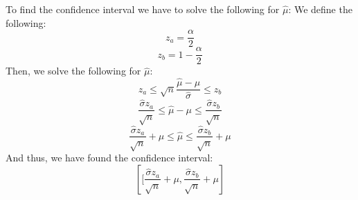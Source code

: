 To find the confidence interval we have to solve the following for $\hat\mu$:
We define the following:
$$
z_a = \frac{\alpha}{2}
$$
$$
z_b = 1-\frac{\alpha}{2}
$$
Then, we solve the following for $\hat\mu$:
$$
z_a \leq \sqrt{n}\frac{\hat\mu - \mu}{\hat\sigma} \leq z_b
$$
$$
\frac{\hat\sigma z_a}{\sqrt{n}} \leq \hat\mu - \mu \leq \frac{\hat\sigma z_b}{\sqrt{n}}
$$
$$
\frac{\hat\sigma z_a}{\sqrt{n}} + \mu \leq \hat\mu \leq \frac{\hat\sigma z_b}{\sqrt{n}} + \mu
$$
And thus, we have found the confidence interval:
$$
\left[[\frac{\hat\sigma z_a}{\sqrt{n}} + \mu,\frac{\hat\sigma z_b}{\sqrt{n}} + \mu\right]
$$